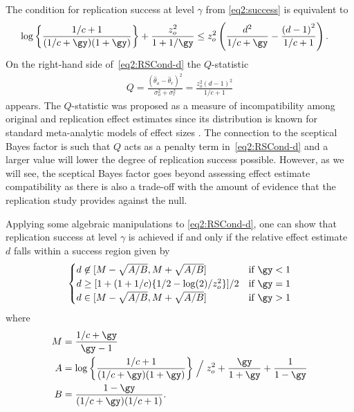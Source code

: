 The condition for replication success at level $\gamma$ from \eqref{eq2:success}
is equivalent to
\begin{align}
  \label{eq2:RSCond-d}
  \log \left\{ \frac{1/c + 1}{(1/c + \gy)(1 + \gy)}\right\} +
  \frac{z_o^2}{1 + 1/\gy} &\leq z_o^2 \left(\frac{d^2}{1/c +
    \gy} - \frac{\left(d - 1\right)^2}{1/c + 1} \right).
\end{align}
On the right-hand side of~\eqref{eq2:RSCond-d} the $Q$-statistic
\begin{align}
  \label{eq2:Qstat}
  Q
  = \frac{(\hat{\theta}_o - \hat{\theta}_r)^2}{\sigma^2_o + \sigma^2_r}
  = \frac{z_o^2(d - 1)^2}{1/c + 1}
\end{align}
appears. The $Q$-statistic was proposed as a measure of incompatibility among
original and replication effect estimates since its distribution is known for
standard meta-analytic models of effect sizes \citep{Hedges2019}. The connection
to the sceptical Bayes factor is such that $Q$ acts as a penalty term
in~\eqref{eq2:RSCond-d} and a larger value will lower the degree of replication
success possible. However, as we will see, the sceptical Bayes factor goes
beyond assessing effect estimate compatibility as there is also a trade-off with
the amount of evidence that the replication study provides against the null.

Applying some algebraic manipulations to \eqref{eq2:RSCond-d}, one can show that
replication success at level $\gamma$ is achieved if and only if the relative
effect estimate $d$ falls within a success region given by
\begin{align}
  \label{eq2:dsuccess}
  \begin{cases}
    d \not\in [M - \sqrt{A/B}, M + \sqrt{A/B}] & \text{if} ~ \gy < 1 \\
    d \geq [1 + (1 + 1/c)\{1/2 - \log(2)/z_o^2\}]/2
    & \text{if} ~ \gy = 1 \\
   d \in [M - \sqrt{A/B}, M + \sqrt{A/B}] & \text{if} ~ \gy > 1\\
  \end{cases}
\end{align}
where
\begin{align*}
  M &= \frac{1/c + \gy}{\gy - 1} \\
  A &= \log \left\{ \frac{1/c + 1}{(1/c + \gy)(1 + \gy)}\right\}\Bigm/ z_o^2 +
  \frac{\gy}{1 + \gy} + \frac{1}{1 - \gy} \\
  B &= \frac{1 - \gy}{(1/c + \gy)(1/c + 1)}.
\end{align*}

